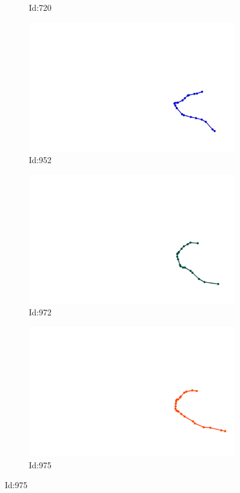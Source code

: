 \documentclass[12pt,twoside]{report}
\begin{document}
\begin{figure}
\begin{subfigure}[b]{0.20\textwidth}
\caption{Id:720}
\end{subfigure}
\begin{subfigure}[b]{0.20\textwidth}
\centering
\includegraphics[width=\textwidth]{../../trajectories/952.png}
\caption{Id:952}
\end{subfigure}
\begin{subfigure}[b]{0.20\textwidth}
\centering
\includegraphics[width=\textwidth]{../../trajectories/972.png}
\caption{Id:972}
\end{subfigure}
\begin{subfigure}[b]{0.20\textwidth}
\centering
\includegraphics[width=\textwidth]{../../trajectories/975.png}
\caption{Id:975}
\end{subfigure}
\end{figure}
\end{document}

